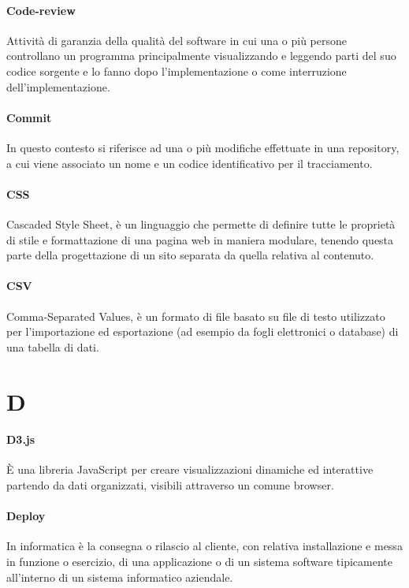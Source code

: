 \documentclass[]{article}
\begin{document}
	\paragraph*{Code-review}
	Attività di garanzia della qualità del software in cui una o più persone controllano un programma principalmente visualizzando e leggendo parti del suo codice sorgente e lo fanno dopo l'implementazione o come interruzione dell'implementazione.
	
	\paragraph*{Commit}
	In questo contesto si riferisce ad una o più modifiche effettuate in una repository, a cui viene associato un nome e un codice identificativo per il tracciamento.
	
	\paragraph*{CSS}
	Cascaded Style Sheet, è un linguaggio che permette di definire tutte le proprietà di stile e formattazione di una pagina web in maniera modulare, tenendo questa parte della progettazione di un sito separata da quella relativa al contenuto.
	
	\paragraph*{CSV}
	Comma-Separated Values, è un formato di file basato su file di testo utilizzato per l'importazione ed esportazione (ad esempio da fogli elettronici o database) di una tabella di dati.

	\newpage

	\section*{D}
	
	\paragraph*{D3.js}
	È una libreria JavaScript per creare visualizzazioni dinamiche ed interattive partendo da dati organizzati, visibili attraverso un comune browser.
	
	\paragraph*{Deploy}
	In informatica è la consegna o rilascio al cliente, con relativa installazione e messa in funzione o esercizio, di una applicazione o di un sistema software tipicamente all’interno di un sistema informatico aziendale.
	
\end{document}

